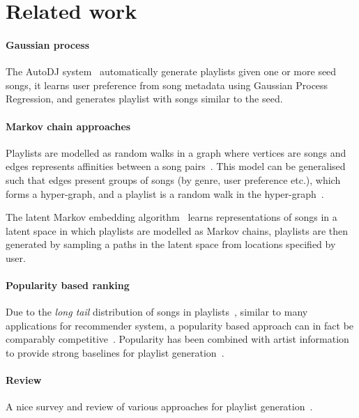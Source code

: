 \section{Related work}
\label{sec:related}

\paragraph{Gaussian process}
The AutoDJ system~\cite{platt2002learning} automatically generate playlists given one or more seed songs, 
it learns user preference from song metadata using Gaussian Process Regression,
and generates playlist with songs similar to the seed.


\paragraph{Markov chain approaches}
Playlists are modelled as random walks in a graph where vertices are songs 
and edges represents affinities between a song pairs~\cite{mcfee2011natural}.
This model can be generalised such that edges present groups of songs (by genre, user preference etc.),
which forms a hyper-graph, and a playlist is a random walk in the hyper-graph~\cite{mcfee2012hypergraph}.

The latent Markov embedding algorithm~\cite{chen2012playlist}
learns representations of songs in a latent space in which playlists are modelled as Markov chains,
playlists are then generated by sampling a paths in the latent space from locations specified by user.

\paragraph{Popularity based ranking}
Due to the \emph{long tail} distribution of songs in playlists~\cite{aoscar2010music},
similar to many applications for recommender system, 
a popularity based approach can in fact be comparably competitive~\cite{cremonesi2010performance}.
Popularity has been combined with artist information to provide strong baselines 
for playlist generation~\cite{mcfee2012million,bonnin2013evaluating,bonnin2015automated}.

\paragraph{Review}
A nice survey and review of various approaches for playlist generation~\cite{bonnin2015automated}.


